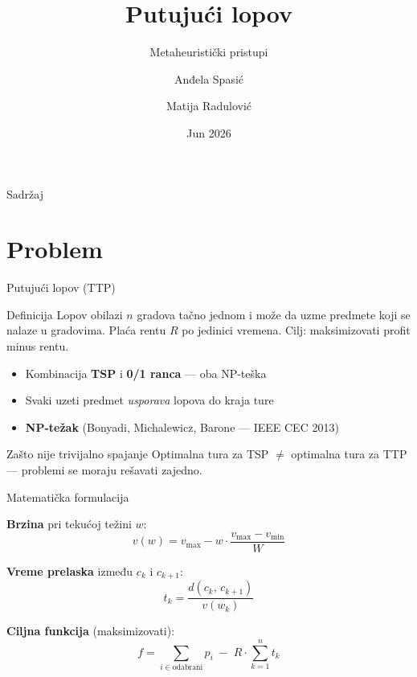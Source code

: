 \documentclass[aspectratio=169]{beamer}
\title[Putujući lopov]{Putujući lopov}
\subtitle{Metaheuristički pristupi}
\author{Anđela Spasić \and Matija Radulović}
\institute{Matematički fakultet, Univerzitet u Beogradu}
\date{Jun 2026}
\begin{document}
\begin{frame}
  \titlepage
\end{frame}

\begin{frame}{Sadržaj}
  \tableofcontents
\end{frame}

\section{Problem}

\begin{frame}{Putujući lopov (TTP)}
  \begin{block}{Definicija}
    Lopov obilazi $n$ gradova tačno jednom i može da uzme predmete koji se
    nalaze u gradovima. Plaća rentu $R$ po jedinici vremena.
    Cilj: maksimizovati profit minus rentu.
  \end{block}

  \bigskip
  \begin{itemize}
    \item Kombinacija \textbf{TSP} i \textbf{0/1 ranca} --- oba NP-teška
    \item Svaki uzeti predmet \emph{usporava} lopova do kraja ture
    \item \textbf{NP-težak} (Bonyadi, Michalewicz, Barone --- IEEE CEC 2013)
  \end{itemize}

  \bigskip
  \begin{alertblock}{Zašto nije trivijalno spajanje}
    Optimalna tura za TSP $\neq$ optimalna tura za TTP ---
    problemi se moraju rešavati zajedno.
  \end{alertblock}
\end{frame}

\begin{frame}{Matematička formulacija}

  \textbf{Brzina} pri tekućoj težini $w$:
  \[
    v(w) = v_{\max} - w \cdot \frac{v_{\max} - v_{\min}}{W}
  \]

  \textbf{Vreme prelaska} između $c_k$ i $c_{k+1}$:
  \[
    t_k = \frac{d(c_k,\, c_{k+1})}{v(w_k)}
  \]

  \textbf{Ciljna funkcija} (maksimizovati):
  \[
    f = \sum_{i \in \text{odabrani}} p_i \;-\; R \cdot \sum_{k=1}^{n} t_k
  \]
\end{frame}
\end{document}
